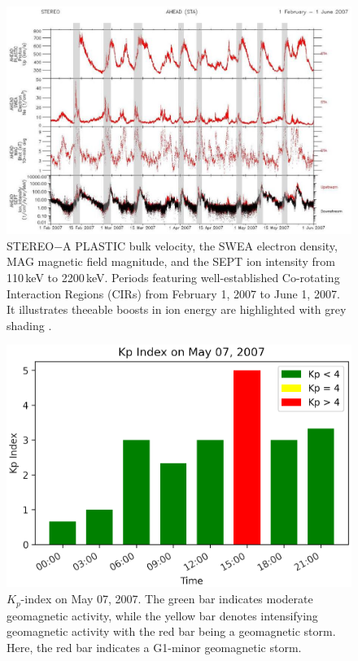 \documentclass[draft]{agujournal2019}
\begin{document}
\begin{figure}[!t]
\centering
\includegraphics[width=1.0\textwidth]{jgr-2023-ipshocks-f28.eps}
\caption{STEREO$-$A PLASTIC bulk velocity, the SWEA electron density, MAG magnetic field magnitude, and the SEPT ion intensity from 110\,keV to 2200\,keV. Periods featuring well-established Co-rotating Interaction Regions (CIRs) from February 1, 2007 to June 1, 2007. It illustrates theeable boosts in ion energy are highlighted with grey shading \cite[Figure~2]{opitz14:_solar_stereo}. \label{fig:cirpaper}}
\end{figure}

\pagebreak

\begin{figure}[!t]
\centering
\includegraphics[width=1.\textwidth]{jgr-2023-ipshocks-f29.eps}
\caption{$K_{p}$-index on May 07, 2007. The green bar indicates moderate geomagnetic activity, while the yellow bar denotes intensifying geomagnetic activity with the red bar being a geomagnetic storm. Here, the red bar indicates a G1-minor geomagnetic storm.}
\label{fig:kp0507}
\end{figure}
\end{document}

